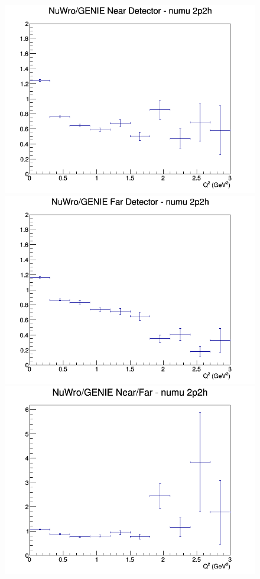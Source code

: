\documentclass[12pt]{article}
\begin{document}
\begin{figure}[h]
\endminipage
\newline
{}
\includegraphics[width=\linewidth]{eff_Q2/FGT/ratios/2p2h_NuWro_GENIE_numu_near_Q2.png}
\endminipage
{}
\includegraphics[width=\linewidth]{eff_Q2/FGT/ratios/2p2h_NuWro_GENIE_numu_far_Q2.png}
\endminipage
{}
\includegraphics[width=\linewidth]{eff_Q2/FGT/ratios/2p2h_NuWro_GENIE_numu_NF_Q2.png}
\endminipage
\newline
\end{figure}
\clearpage
\end{document}
